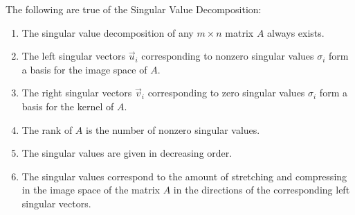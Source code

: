 \documentclass{ximera}
\begin{document}
\begin{theorem}

  The following are true of the Singular Value Decomposition:

  \begin{enumerate}
    \item The singular value decomposition of any $m\times n$ matrix $A$ always exists.
    \item The left singular vectors $\vec{u}_i$ corresponding to nonzero singular values $\sigma_i$ form a basis for the image space of $A$.
    \item The right singular vectors $\vec{v}_i$ corresponding to zero singular values $\sigma_i$ form a basis for the kernel of $A$.
    \item The rank of $A$ is the number of nonzero singular values. 
    \item The singular values are given in decreasing order.
    \item The singular values correspond to the amount of stretching and compressing in the image space of the matrix $A$ in the directions of the corresponding left singular vectors.
  \end{enumerate}

\end{theorem}
\end{document}
